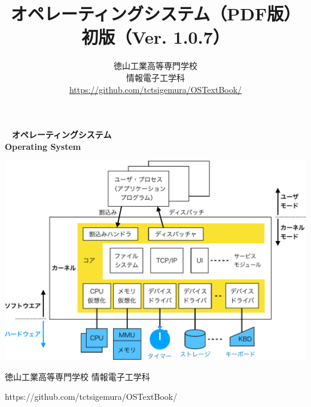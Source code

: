 \documentclass[a4paper,11pt,twocolumn]{ltjsbook}     %
\newif\ifPDF
\newcommand{\pdf}{（PDF版）}
\newcommand{\pdf}{}
\newcommand{\edition}{初版}
\newcommand{\ver}{Ver. 1.0.7}
\begin{document}
\setcounter{page}{0}
\thispagestyle{empty}
\onecolumn
~
\vfill
\vfill
{\noindent
\fontsize{34pt}{50pt}\selectfont\textbf{オペレーティングシステム}\\
\fontsize{34pt}{50pt}\selectfont\textbf{Operating System}
}
\vfill
\vfill
\centerline{
  \includegraphics[scale=0.77]{Fig/osOrganization-crop.pdf}
}
\vfill
\vfill
\centerline{\Large 徳山工業高等専門学校 情報電子工学科}
\centerline{\Large\ttfamily https://github.com/tctsigemura/OSTextBook/}
\vfill

\ifPDF
\newpage
\setcounter{page}{0}
\thispagestyle{empty}
\onecolumn
~
\fi

\frontmatter
\title{オペレーティングシステム{\pdf}\\{\edition}（{\ver}）}
\author{徳山工業高等専門学校\\情報電子工学科\\
\url{https://github.com/tctsigemura/OSTextBook/}}
\date{}
\maketitle
\end{document}
